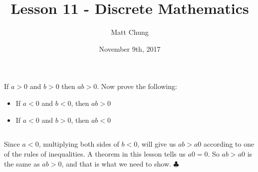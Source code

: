 \documentclass{article}
\title{Lesson 11 - Discrete Mathematics}
\author{Matt Chung}
\date{November 9th, 2017}
\begin{document}
\maketitle

\section{}

If $a > 0$ and $b > 0$ then $ab > 0$. Now prove the following:

\begin{itemize}
    \item If $a < 0$ and $b < 0$, then $ab > 0$ 
    \item If $a < 0$ and $b > 0$, then $ab < 0$
\end{itemize}






\subsection{}

Since $a<0$, multiplying both sides of $b < 0$, will give us $ab > a0$ according to one of the rules of inequalities. A theorem in this lesson tells us $a0 = 0$. So $ab > a0$ is the same as $ab > 0$, and that is what we need to show. $\clubsuit$
\end{document}

